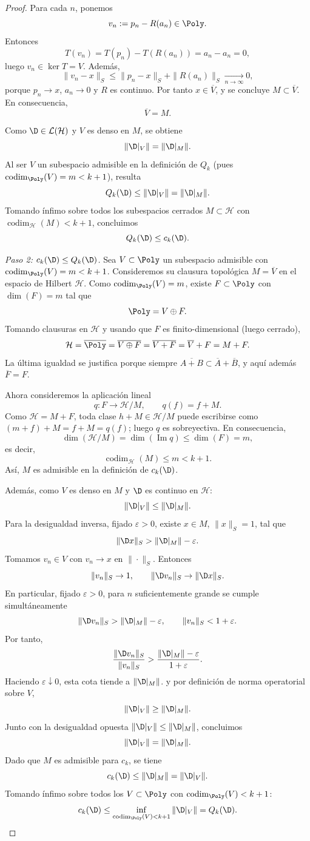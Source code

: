 \begin{proof}
	Para cada $n$, ponemos
	\[
		v_n:=p_n-R(a_n)\in\Poly.
	\]
	Entonces
	\[
		T(v_n)=T(p_n)-T(R(a_n))=a_n-a_n=0,
	\]
	luego $v_n\in\ker T=V$. Además,
	\[
		\|v_n-x\|_S\le \|p_n-x\|_S+\|R(a_n)\|_S\xrightarrow[n\to\infty]{}0,
	\]
	porque $p_n\to x$, $a_n\to0$ y $R$ es continuo. Por tanto $x\in\overline V$, y se concluye $M\subset\overline V$. En consecuencia,
	\[
		\overline V=M.
	\]

	Como $\D\in\mathcal L(\mathcal H)$ y $V$ es denso en $M$, se obtiene
	\[
		\|\D|_V\|=\|\D|_M\|.
	\]
	Al ser $V$ un subespacio admisible en la definición de $Q_k$ (pues $\operatorname{codim}_{\Poly}(V)=m<k+1$), resulta
	\[
		Q_k(\D)\le \|\D|_V\|=\|\D|_M\|.
	\]
	Tomando ínfimo sobre todos los subespacios cerrados $M\subset\mathcal H$ con $\operatorname{codim}_{\mathcal H}(M)<k+1$, concluimos
	\[
		Q_k(\D)\le c_k(\D).
	\]

	\emph{Paso 2: $c_k(\D) \le Q_k(\D)$.}
	Sea $V \subset \Poly$ un subespacio admisible con $\operatorname{codim}_{\Poly}(V) = m < k+1$. Consideremos su clausura topológica $M = \overline{V}$ en el espacio de Hilbert $\mathcal{H}$.
	Como $\operatorname{codim}_{\Poly}(V)=m$, existe $F\subset\Poly$ con $\dim(F)=m$ tal que
	\[
		\Poly=V\oplus F.
	\]
	Tomando clausuras en $\mathcal{H}$ y usando que $F$ es finito-dimensional (luego cerrado),
	\[
		\mathcal{H}=\overline{\Poly}=\overline{V\oplus F}=\overline{V+F}=\overline V+F=M+F.
	\]
	La última igualdad se justifica porque siempre $\overline{A+B}\subset \overline A+\overline B$, y aquí además $\overline F=F$.

	Ahora consideremos la aplicación lineal
	\[
		q:F\to \mathcal H/M,\qquad q(f)=f+M.
	\]
	Como $\mathcal H=M+F$, toda clase $h+M\in\mathcal H/M$ puede escribirse como $(m+f)+M=f+M=q(f)$; luego $q$ es sobreyectiva. En consecuencia,
	\[
		\dim(\mathcal{H}/M)=\dim(\operatorname{Im}q)\le \dim(F)=m,
	\]
	es decir,
	\[
		\operatorname{codim}_{\mathcal{H}}(M)\le m<k+1.
	\]
	Así, $M$ es admisible en la definición de $c_k(\D)$.

	Además, como $V$ es denso en $M$ y $\D$ es continuo en $\mathcal{H}$:
	\[
		\|\D|_V\|\le \|\D|_M\|.
	\]
	Para la desigualdad inversa, fijado $\varepsilon>0$, existe $x\in M$, $\|x\|_S=1$, tal que
	\[
		\|\D x\|_S>\|\D|_M\|-\varepsilon.
	\]
	Tomamos $v_n\in V$ con $v_n\to x$ en $\|\cdot\|_S$. Entonces
	\[
		\|v_n\|_S\to 1,
		\qquad
		\|\D v_n\|_S\to \|\D x\|_S.
	\]
	En particular, fijado $\varepsilon>0$, para $n$ suficientemente grande se cumple simultáneamente
	\[
		\|\D v_n\|_S>\|\D|_M\|-\varepsilon,
		\qquad
		\|v_n\|_S<1+\varepsilon.
	\]
	Por tanto,
	\[
		\frac{\|\D v_n\|_S}{\|v_n\|_S}
		>
		\frac{\|\D|_M\|-\varepsilon}{1+\varepsilon}.
	\]
	Haciendo $\varepsilon\downarrow 0$, esta cota tiende a $\|\D|_M\|$.
	y por definición de norma operatorial sobre $V$,
	\[
		\|\D|_V\|\ge \|\D|_M\|.
	\]
	Junto con la desigualdad opuesta $\|\D|_V\|\le \|\D|_M\|$, concluimos
	\[
		\|\D|_V\|=\|\D|_M\|.
	\]
	Dado que $M$ es admisible para $c_k$, se tiene
	\[
		c_k(\D)\le \|\D|_M\|=\|\D|_V\|.
	\]
	Tomando ínfimo sobre todos los $V\subset\Poly$ con $\operatorname{codim}_{\Poly}(V)<k+1$:
	\[
		c_k(\D)\le \inf_{\operatorname{codim}_{\Poly}(V)<k+1}\|\D|_V\|=Q_k(\D).
	\]


\end{proof}
